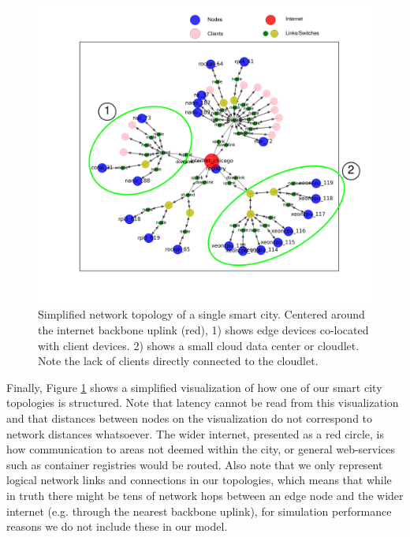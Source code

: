 \documentclass[draft,final]{vutinfth} %
\begin{document}
\begin{figure}
    \centering
    \includegraphics[width=\linewidth]{graphics/diagrams/tiny_topo.png}
    \caption{Simplified network topology of a single smart city. Centered around the internet backbone uplink (red), 1) shows edge devices co-located with client devices. 2) shows a small cloud data center or cloudlet. Note the lack of clients directly connected to the cloudlet.}
    \label{fig:tiny_topo}
\end{figure}

Finally, Figure \ref{fig:tiny_topo} shows a simplified visualization of how one of our smart city topologies is structured.
Note that latency cannot be read from this visualization and that distances between nodes on the visualization do not correspond to network distances whatsoever.
The wider internet, presented as a red circle, is how communication to areas not deemed within the city, or general web-services such as container registries would be routed.
Also note that we only represent logical network links and connections in our topologies, which means that while in truth there might be tens of network hops between an edge node and the wider internet (e.g. through the nearest backbone uplink), for simulation performance reasons we do not include these in our model.
\end{document}
